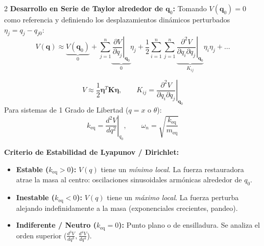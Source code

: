 \documentclass[10pt,a4paper]{article}
\begin{document}
\begin{multicols}{2}
\textbf{Desarrollo en Serie de Taylor alrededor de $\mathbf{q}_0$:}
Tomando $V(\mathbf{q}_0) = 0$ como referencia y definiendo los desplazamientos dinámicos perturbados $\eta_j = q_j - q_{j0}$:
\begin{equation*}
  V(\mathbf{q}) \approx \underbrace{V(\mathbf{q}_0)}_{0} + \sum_{j=1}^{n} \underbrace{\left.\frac{\partial V}{\partial q_j}\right|_{\mathbf{q}_0}}_{0}\eta_j + \frac{1}{2}\sum_{i=1}^{n}\sum_{j=1}^{n} \underbrace{\left.\frac{\partial^2 V}{\partial q_i \partial q_j}\right|_{\mathbf{q}_0}}_{K_{ij}} \eta_i \eta_j + \dots
\end{equation*}

\begin{formulabox}
\begin{equation*}
  V \approx \frac{1}{2} \boldsymbol{\eta}^T \mathbf{K} \boldsymbol{\eta}, \qquad
  K_{ij} = \left. \frac{\partial^2 V}{\partial q_i \partial q_j} \right|_{\mathbf{q}_0}
\end{equation*}
Para sistemas de 1 Grado de Libertad ($q = x$ o $\theta$):
\begin{equation*}
  k_{\text{eq}} = \left. \frac{d^2 V}{dq^2} \right|_{q_0}, \qquad \omega_n = \sqrt{\frac{k_{\text{eq}}}{m_{\text{eq}}}}
\end{equation*}
\end{formulabox}

\textbf{Criterio de Estabilidad de Lyapunov / Dirichlet:}
\begin{itemize}\setlength{\itemsep}{1pt}\setlength{\parskip}{0pt}
  \item \textbf{\color{accentgreen}Estable ($k_{\text{eq}} > 0$):} $V(q)$ tiene un \emph{mínimo local}. La fuerza restauradora atrae la masa al centro: oscilaciones sinusoidales armónicas alrededor de $q_0$.
  \item \textbf{\color{accentred}Inestable ($k_{\text{eq}} < 0$):} $V(q)$ tiene un \emph{máximo local}. La fuerza perturba alejando indefinidamente a la masa (exponenciales crecientes, pandeo).
  \item \textbf{Indiferente / Neutro ($k_{\text{eq}} = 0$):} Punto plano o de ensilladura. Se analiza el orden superior ($\frac{d^3V}{dq^3}, \frac{d^4V}{dq^4}$).
\end{itemize}

\begin{center}
\end{center}
\end{multicols}
\end{document}

